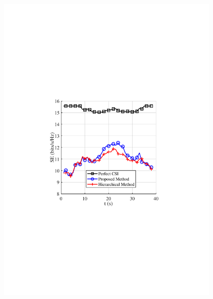 \documentclass[journal,12pt,onecolumn,draftclsnofoot,]{IEEEtran}
\begin{document}
\begin{figure}
{\hspace{-6mm}\includegraphics[scale=0.46]{8-2.pdf}\hspace{-7mm}
}
\quad
\subfloat[]{
}
\end{figure}
\end{document}
